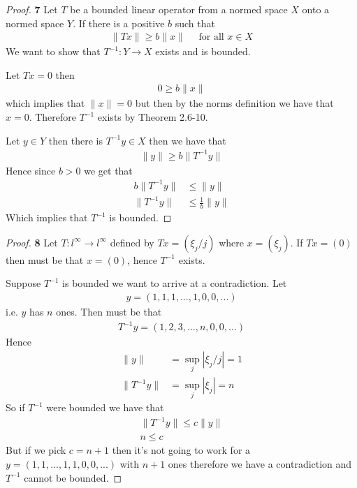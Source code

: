 \documentclass[11pt]{article}
\theoremstyle{definition}
\begin{document}
\cleardoublepage
\begin{proof}{\textbf{7}}
    Let $T$ be a bounded linear operator from a normed space $X$ onto a normed
    space $Y$. If there is a positive $b$ such that
    \begin{align*}
        \|Tx\| \geq b \|x\| \quad \text{ for all }x\in X
    \end{align*}
    We want to show that $T^{-1}: Y \to X$ exists and is bounded.

    Let $Tx = 0$ then
    \begin{align*}
        0 \geq b \|x\|
    \end{align*}
    which implies that $\|x\| = 0$ but then by the norms definition we have
    that $x = 0$. Therefore $T^{-1}$ exists by Theorem 2.6-10.
    
    Let $y \in Y$ then there is $T^{-1}y \in X$ then we have that
    \begin{align*}
        \|y\| \geq b \|T^{-1}y\|
    \end{align*}
    Hence since $b > 0$ we get that
    \begin{align*}
        b \|T^{-1}y\| &\leq \|y\|\\
        \|T^{-1}y\| &\leq \frac{1}{b}\|y\|
    \end{align*}
    Which implies that $T^{-1}$ is bounded.
\end{proof}
\cleardoublepage
\begin{proof}{\textbf{8}}
    Let $T: l^\infty \to l^\infty$ defined by $Tx = (\xi_j/j)$ where
    $x = (\xi_j)$. If $Tx = (0)$ then must be that $x = (0)$, hence $T^{-1}$
    exists.

    Suppose $T^{-1}$ is bounded we want to arrive at a contradiction. Let
    \begin{align*}
        y = (1, 1, 1, ..., 1, 0, 0, ...)
    \end{align*}
    i.e. $y$ has $n$ ones. Then must be that
    \begin{align*}
        T^{-1}y = (1, 2, 3, ..., n, 0, 0, ...)
    \end{align*}
    Hence
    \begin{align*}
        \|y\| &= \sup_j |\xi_j/j| = 1\\
        \|T^{-1}y\| &= \sup_j |\xi_j| = n
    \end{align*}
    So if $T^{-1}$ were bounded we have that
    \begin{align*}
        \|T^{-1}y\| \leq c\|y\|\\
        n \leq c
    \end{align*}
    But if we pick $c = n + 1$ then it's not going to work for a
    $y = (1, 1, ..., 1, 1, 0, 0, ...)$ with $n + 1$ ones therefore
    we have a contradiction and $T^{-1}$ cannot be bounded.
\end{proof}
\end{document}
